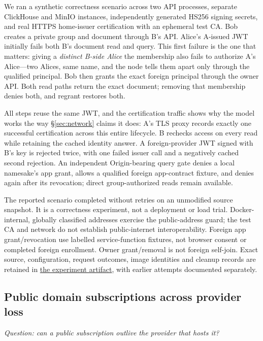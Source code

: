 \documentclass[sigconf, nonacm]{acmart}
\newcommand{\artifactbase}{https://github.com/jacoby149/web10}
\newcommand{\domainartifactrev}{26720acba859c7eb03fc5d26a6221cdde5b764a1}
\newcommand{\domainartifactdir}[2]{\href{\artifactbase/tree/\domainartifactrev/#1}{#2}}
\begin{document}
We ran a synthetic correctness scenario across two API processes, separate
ClickHouse and MinIO instances, independently generated HS256 signing
secrets, and real HTTPS home-issuer certification with an ephemeral test CA.
Bob creates a private group and document through B's API. Alice's
A-issued JWT initially fails both B's document read and query. This first
failure is the one that matters: giving a \emph{distinct B-side Alice} the
membership also fails to authorize A's Alice---two Alices, same name, and the
node tells them apart only through the qualified principal. Bob then grants
the exact foreign principal through the owner API. Both read paths return the
exact document; removing that membership denies both, and regrant restores
both.

All steps reuse the same JWT, and the certification traffic shows why the
model works the way \S\ref{sec:network} claims it does: A's TLS proxy records
exactly one successful certification across this entire lifecycle. B
rechecks access on every read while retaining the cached identity answer. A
foreign-provider JWT signed with B's key is rejected twice, with one failed
issuer call and a negatively cached second rejection. An independent
Origin-bearing query gate denies a local namesake's app grant, allows a
qualified foreign app-contract fixture, and denies again after its
revocation; direct group-authorized reads remain available.

The reported scenario completed without retries on an unmodified source
snapshot. It is a correctness experiment, not a deployment or load trial.
Docker-internal, globally classified addresses exercise the public-address
guard; the test CA and network do not establish public-internet
interoperability. Foreign app grant/revocation use labelled service-function
fixtures, not browser consent or completed foreign enrollment. Owner
grant/removal is not foreign self-join. Exact source, configuration, request
outcomes, image identities and cleanup records are retained in
\domainartifactdir{research/federation-demo}{the experiment artifact}, with
earlier attempts documented separately.

\subsection{Public domain subscriptions across provider loss}
\label{sec:domain-results}

\emph{Question: can a public subscription outlive the provider that hosts
it?}
\end{document}
